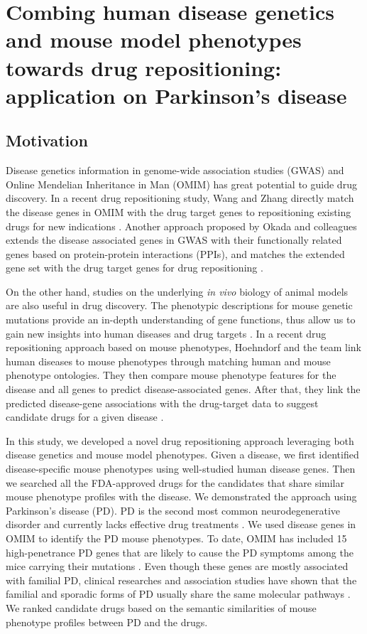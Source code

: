 \chapter{Combing human disease genetics and mouse model phenotypes towards drug repositioning: application on Parkinson's disease}\label{drug}

\section{Motivation}
Disease genetics information in
genome-wide association studies (GWAS) \cite{sanseau2012use} and
Online Mendelian Inheritance in Man (OMIM) \cite{wang2013rational} has great
potential to guide drug discovery.
In a recent drug repositioning study, Wang and Zhang
directly match the disease genes
in OMIM with the drug target genes to repositioning
existing drugs for new indications \cite{wang2013rational}.
Another approach proposed by Okada and colleagues
extends the disease associated genes in GWAS
with their functionally related genes based on
protein-protein interactions (PPIs), and matches
the extended gene set with the drug target genes
for drug repositioning \cite{okada2014genetics}.


On the other hand, studies on the underlying {\it in vivo}
biology of animal models are also useful in drug discovery.
The phenotypic descriptions for mouse genetic mutations
provide an in-depth understanding of gene functions,
thus allow us to gain new insights into human diseases
\cite{hoehndorf2011phenomenet}
and drug targets \cite{hoehndorf2014mouse}.
In a recent drug repositioning approach based on mouse phenotypes,
Hoehndorf and the team link human diseases to mouse phenotypes
through matching human and mouse phenotype ontologies.
They then compare mouse phenotype features for the disease and
all genes to predict disease-associated genes. After that,
they link the predicted disease-gene associations with
the drug-target data to suggest candidate drugs for a given disease \cite{hoehndorf2012linking}.

In this study, we developed a novel drug repositioning approach
leveraging both disease genetics and mouse model phenotypes.
Given a disease, we first identified disease-specific mouse phenotypes
using well-studied human disease genes. Then we searched
all the FDA-approved drugs for the candidates that share
similar mouse phenotype profiles with the disease.
We demonstrated the approach using Parkinson's disease (PD).
PD is the second most common neurodegenerative disorder and
currently lacks effective drug treatments \cite{olanow2009scientific}.
We used disease genes in OMIM to identify the
PD mouse phenotypes. To date, OMIM has included 15 high-penetrance
PD genes that are likely to cause the PD symptoms among
the mice carrying their mutations \cite{hamosh2005online}.
Even though these genes are mostly associated with familial PD,
clinical researches and association studies have shown that the
familial and sporadic forms of PD usually share the same molecular pathways
\cite{lesage2009parkinson,lesage2012role}. We ranked candidate drugs based on the
semantic similarities of mouse phenotype profiles between PD and the drugs.

